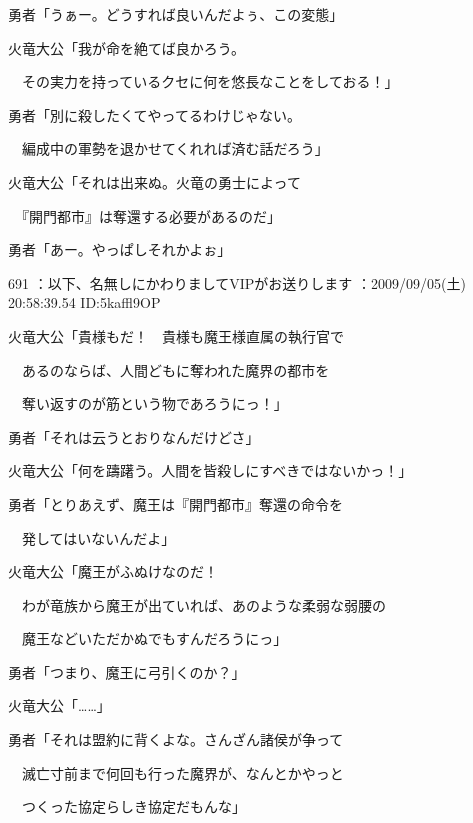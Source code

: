 \documentclass[a4j,twocolumn]{tarticle}
\begin{document}
勇者「うぁー。どうすれば良いんだよぅ、この変態」 



火竜大公「我が命を絶てば良かろう。\par{} 
　その実力を持っているクセに何を悠長なことをしておる！」 



勇者「別に殺したくてやってるわけじゃない。\par{} 
　編成中の軍勢を退かせてくれれば済む話だろう」 



火竜大公「それは出来ぬ。火竜の勇士によって\par{} 
　『開門都市』は奪還する必要があるのだ」 



勇者「あー。やっぱしそれかよぉ」 

	
    
    

691 ：以下、名無しにかわりましてVIPがお送りします ：2009/09/05(土) 20:58:39.54 ID:5kaffl9OP 


火竜大公「貴様もだ！　貴様も魔王様直属の執行官で\par{} 
　あるのならば、人間どもに奪われた魔界の都市を\par{} 
　奪い返すのが筋という物であろうにっ！」 



勇者「それは云うとおりなんだけどさ」 



火竜大公「何を躊躇う。人間を皆殺しにすべきではないかっ！」 



勇者「とりあえず、魔王は『開門都市』奪還の命令を\par{} 
　発してはいないんだよ」 



火竜大公「魔王がふぬけなのだ！\par{} 
　わが竜族から魔王が出ていれば、あのような柔弱な弱腰の\par{} 
　魔王などいただかぬでもすんだろうにっ」 



勇者「つまり、魔王に弓引くのか？」\par{} 
火竜大公「……」 



勇者「それは盟約に背くよな。さんざん諸侯が争って\par{} 
　滅亡寸前まで何回も行った魔界が、なんとかやっと\par{} 
　つくった協定らしき協定だもんな」 
\end{document}

